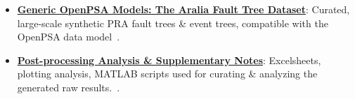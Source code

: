 \begin{itemize}
    \item \textbf{\href{https://doi.org/10.5281/zenodo.15293416}{Generic OpenPSA Models: The Aralia Fault Tree Dataset}}: Curated, large-scale synthetic PRA fault trees \& event trees, compatible with the OpenPSA data model~\cite{earthperson_generic_2021}.

    \item \textbf{\href{https://zenodo.org/doi/10.5281/zenodo.15320401}{Post-processing Analysis \& Supplementary Notes}}: Excelsheets, plotting analysis, MATLAB scripts used for curating \& analyzing the generated raw results.~\cite{earthperson_benchmarks_2025}.
\end{itemize}